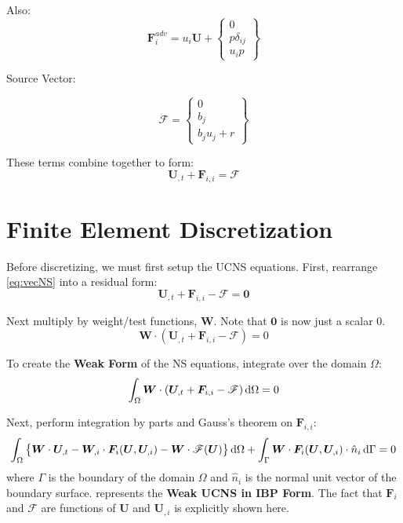 \documentclass[11pt, letterpaper, twoside]{article}
\renewcommand{\vec}[1]{\bm{#1}}
\newcommand{\U}{\vec{U}}
\newcommand{\F}{\vec{F}}
\newcommand{\W}{\vec{W}}
\newcommand{\src}{\vec{\mathscr{F}}}
\begin{document}
    Also:
    \begin{equation}
        \F_i^{adv}  = 
        u_i \U
        + \begin{Bmatrix}
            0 \\
            p \delta_{ij}\\
            u_i p
        \end{Bmatrix} 
    \end{equation}

    Source Vector:

    \begin{equation}
        \src = 
        \begin{Bmatrix}
            0 \\
            b_j \\
            b_j u_j + r
        \end{Bmatrix}
    \end{equation}

    These terms combine together to form:
    \begin{equation} \label{eq:vecNS}
        \U_{,t} + \F_{i,i} = \src
    \end{equation}

\section{Finite Element Discretization}

    Before discretizing, we must first setup the UCNS equations. First, rearrange \cref{eq:vecNS} into a residual form:
    \begin{equation}
        \U_{,t} + \F_{i,i} - \src = \vec{0}
    \end{equation}

    Next multiply by weight/test functions, \(\W\). Note that \(\vec{0}\) is now just a scalar 0.
    \begin{equation}
        \W \cdot ( \U_{,t} + \F_{i,i} - \src )= 0
    \end{equation}

    To create the \textbf{Weak Form} of the NS equations, integrate over the domain \(\Omega\):
    \begin{equation}
        \int_\Omega \W \cdot (\U_{,t} + \F_{i,i} - \src) \dif \Omega= 0
    \end{equation}

    Next, perform integration by parts and Gauss's theorem on \(\F_{i,i}\):
    \begin{equation} \label{eq:weakUCNS_IBP}
        \int_\Omega \left\{\W \cdot \U_{,t} - \W_{,i} \cdot \F_i(\U, \U_{,i}) - \W \cdot \src(\U) \right\} \dif \Omega 
        + \int_\Gamma \W \cdot \F_i(\U, \U_{,i}) \cdot \hat n_i \dif\Gamma= 0
    \end{equation}
    where \(\Gamma\) is the boundary of the domain \(\Omega\) and \(\hat n_i\) is the normal unit vector of the boundary surface.  represents the \textbf{Weak UCNS in IBP Form}. The fact that \(\F_i\) and \(\src\) are functions of \(\U\) and \(\U_{,i}\) is explicitly shown here.
\end{document}
